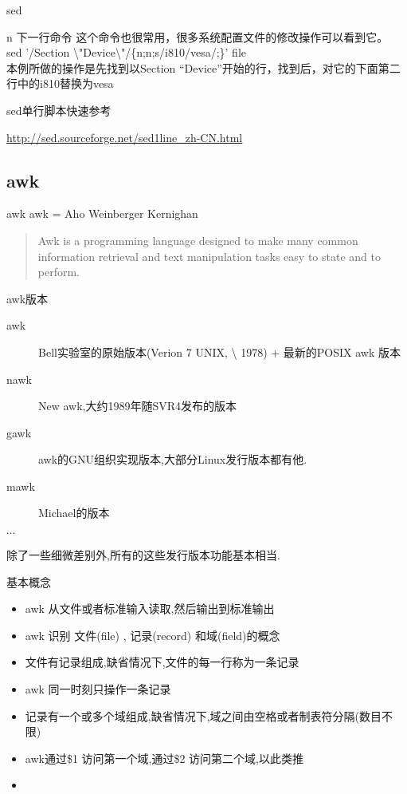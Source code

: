 \begin{frame}{sed}
\begin{block}{\alert{n} 下一行命令}
这个命令也很常用，很多系统配置文件的修改操作可以看到它。\\
sed '/Section \textbackslash{}"Device\textbackslash"{}/\{n;n;s/i810/vesa/;\}’ file \\
本例所做的操作是先找到以Section “Device”开始的行，找到后，对它的下面第二行中的i810替换为vesa
\end{block}

\begin{block}{sed单行脚本快速参考}

\href{http://sed.sourceforge.net/sed1line\_zh-CN.html}{http://sed.sourceforge.net/sed1line\_zh-CN.html}
\end{block}
\end{frame}

\subsection{awk}

\begin{frame}{awk}
\alert{awk} = \alert{A}ho \alert{W}einberger \alert{K}ernighan
\begin{quote}
Awk is a programming language designed to make many common information  retrieval  and text manipulation tasks  easy to state and to perform.
\end{quote}
\end{frame}

\begin{frame}{awk版本}
\begin{description}
\item[awk] Bell实验室的原始版本(Verion 7 UNIX, \textbackslash{} 1978) + 最新的POSIX awk 版本
\item[nawk] New awk,大约1989年随SVR4发布的版本
\item[gawk] awk的GNU组织实现版本,大部分Linux发行版本都有他.
\item[mawk] Michael的版本
\item[$\cdots$]
\end{description}
除了一些细微差别外,所有的这些发行版本功能基本相当.
\end{frame}

\begin{frame}{基本概念}
\begin{itemize}
\item awk 从文件或者标准输入读取,然后输出到标准输出
\item awk 识别 文件(file) , 记录(record) 和域(field)的概念
\item 文件有记录组成,缺省情况下,文件的每一行称为一条记录
\item awk 同一时刻只操作一条记录
\item 记录有一个或多个域组成,缺省情况下,域之间由空格或者制表符分隔(数目不限)
\item awk通过\${}1 访问第一个域,通过\${}2 访问第二个域,以此类推
\item 
\end{itemize}
\end{frame}

